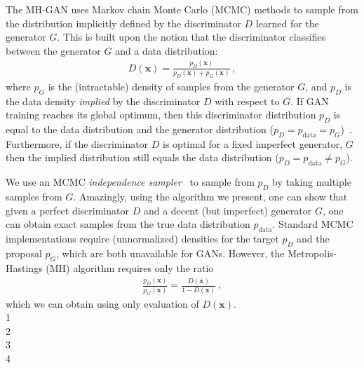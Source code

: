 \documentclass{article}
\renewcommand{\vec}[1]{{\boldsymbol{\mathbf{#1}}}} %
\newcommand{\PG}{{p_G}}
\newcommand{\PD}{{p_D}}
\newcommand{\PR}{{p_{\textrm{data}}}}
\begin{document}
The MH-GAN uses Markov chain Monte Carlo (MCMC) methods to sample from the distribution implicitly defined by the discriminator $D$ learned for the generator $G$.
This is built upon the notion that the discriminator classifies between the generator $G$ and a data distribution:
\begin{align}
  D(\vec x) = \frac{\PD(\vec x)}{\PD(\vec x) + \PG(\vec x)} \,, \label{eq:define PD}
\end{align}
where $\PG$ is the (intractable) density of samples from the generator $G$, and $\PD$ is the data density \emph{implied} by the discriminator $D$ with respect to $G$.
If GAN training reaches its global optimum, then this discriminator distribution $\PD$ is equal to the data distribution and the generator distribution ($\PD = \PR = \PG$)~\citep{Goodfellow2014}.
Furthermore, if the discriminator $D$ is optimal for a fixed imperfect generator, $G$ then the implied distribution still equals the data distribution ($\PD = \PR \neq \PG$)\@.



We use an MCMC \emph{independence sampler}~\citep{Tierney1994} to sample from $\PD$ by taking multiple samples from $G$\@.
Amazingly, using the algorithm we present, one can show that given a perfect discriminator $D$ and a decent (but imperfect) generator $G$, one can obtain exact samples from the true data distribution $\PR$.
Standard MCMC implementations require (unnormalized) densities for the target $\PD$ and the proposal $\PG$, which are both unavailable for GANs.
However, the Metropolis-Hastings (MH) algorithm requires only the ratio
\begin{align}
  \frac{\PD(\vec x)}{\PG(\vec x)} = \frac{D(\vec x)}{1 - D(\vec x)}\,, \label{eq:PD inv}
\end{align}
which we can obtain using only evaluation of $D(\vec x)$.\\
1\\  %
2\\
3\\
4

\end{document}

